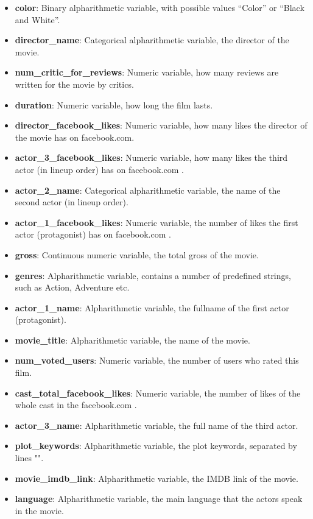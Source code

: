 \documentclass[letterpaper,twocolumn,10pt]{article}
\begin{document}
\begin{itemize}
\item \textbf{color}: Binary alpharithmetic variable, with possible values “Color” or “Black and White”.
\item \textbf{director\_name}: Categorical alpharithmetic variable, the director of the movie.
\item \textbf{num\_critic\_for\_reviews}: Numeric variable, how many reviews are written for the movie by critics.
\item \textbf{duration}: Numeric variable, how long the film lasts.
\item \textbf{director\_facebook\_likes}: Numeric variable, how many likes the director of the movie has on facebook.com.
\item \textbf{actor\_3\_facebook\_likes}: Numeric variable, how many likes the third actor (in lineup order) has on facebook.com .
\item \textbf{actor\_2\_name}: Categorical alpharithmetic variable, the name of the second actor (in lineup order).
\item \textbf{actor\_1\_facebook\_likes}: Numeric variable, the number of likes the first actor (protagonist) has on facebook.com .
\item \textbf{gross}: Continuous numeric variable, the total gross of the movie.
\item \textbf{genres}: Alpharithmetic variable, contains a number of predefined strings, such as Action, Adventure etc.
\item \textbf{actor\_1\_name}: Alpharithmetic variable, the fullname of the first actor (protagonist).
\item \textbf{movie\_title}: Alpharithmetic variable, the name of the movie.
\item \textbf{num\_voted\_users}: Numeric variable, the number of users who rated this film.
\item \textbf{cast\_total\_facebook\_likes}: Numeric variable, the number of likes of the whole cast in the facebook.com .
\item \textbf{actor\_3\_name}: Alpharithmetic variable, the full name of the third actor.
\item \textbf{plot\_keywords}: Alpharithmetic variable, the plot keywords, separated by lines "\textbar".
\item \textbf{movie\_imdb\_link}: Alpharithmetic variable, the IMDB link of the movie. 
\item \textbf{language}: Alpharithmetic variable, the main language that the actors speak in the movie.

\end{itemize}
\end{document}

